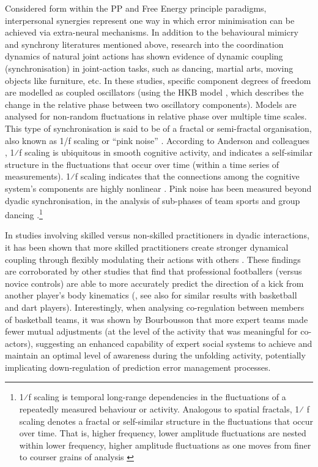 \begin{CJK}{UTF8}{gbsn}
Considered form within the PP and Free Energy principle paradigms, interpersonal synergies represent one way in which error minimisation can be achieved via extra-neural mechanisms.  In addition to the behavioural mimicry and synchrony literatures mentioned above, research into the coordination dynamics of natural joint actions  has shown evidence of dynamic coupling (synchronisation) in joint-action tasks, such as dancing, martial arts, moving objects like furniture, etc. In these studies, specific component degrees of freedom are modelled as coupled oscillators (using the HKB model \citep{Haken1985,Kelso1986}, which describes the change in the relative phase between two oscillatory components). Models are analysed for non-random fluctuations in relative phase over multiple time scales.  This type of synchronisation is said to be of a fractal or semi-fractal organisation, also known as 1/f scaling or ``pink noise'' \citep{Caron2017}. According to Anderson and colleagues \citep{Anderson2012}, 1⁄f scaling is ubiquitous in smooth cognitive activity, and indicates a self-similar structure in the fluctuations that occur over time (within a time series of measurements).
1⁄f scaling indicates that the connections among the cognitive system's components are highly nonlinear \citep{Ding2002,Holden2013,Kello2010,Riley2011,VanOrden2003,VanOrden2005}. Pink noise has been measured beyond dyadic synchronisation, in the analysis of sub-phases of team sports \citep{Passos2014,Duarte2012} and group dancing \citep{Chauvigne2017}.\footnote{1⁄f scaling is temporal long-range dependencies in the fluctuations of a repeatedly measured behaviour or activity. Analogous to spatial fractals, 1⁄ f scaling denotes a fractal or self-similar structure in the fluctuations that occur over time. That is, higher frequency, lower amplitude fluctuations are nested within lower frequency, higher amplitude fluctuations as one moves from finer to courser grains of analysis \cites(for a more detailed description see, for example)(){Holden2005}{Kello2009}}

In studies involving skilled versus non-skilled practitioners in dyadic interactions, it has been shown that more skilled practitioners create stronger dynamical coupling through flexibly modulating their actions with others \citep{Schmidt2011, Caron2017}. These findings are corroborated by other studies that find that professional footballers (versus novice controls) are able to more accurately predict the direction of a kick from another player's body kinematics (\cite{Tomeo2012}, see also \cite{Aglioti2008,Mulligan2016} for similar results with basketball and dart players). Interestingly, when analysing co-regulation between members of basketball teams, it was shown by Bourbousson \textcite{Bourbousson2015} that more expert teams made fewer mutual adjustments (at the level of the activity that was meaningful for co-actors), suggesting an enhanced capability of expert social systems to achieve and maintain an optimal level of awareness during the unfolding activity, potentially implicating down-regulation of prediction error management processes.


\end{CJK}
